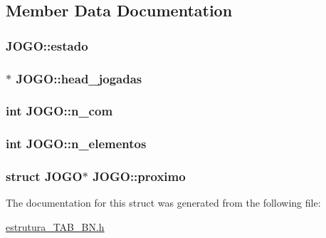 \subsection{Member Data Documentation}
\hypertarget{structJOGO_a8be710a209c24ac0f77dc6ec345131c0}{
\subsubsection[{estado}]{ J\-O\-G\-O\-::estado}}\label{structJOGO_a8be710a209c24ac0f77dc6ec345131c0}
\hypertarget{structJOGO_ae6a10fd45e48577ebe24ce85f0d3ce66}{
\subsubsection[{head\-\_\-jogadas}]{$\ast$ J\-O\-G\-O\-::head\-\_\-jogadas}}\label{structJOGO_ae6a10fd45e48577ebe24ce85f0d3ce66}
\hypertarget{structJOGO_a8a2e1124aa5a80bca5be947df1d1d5e4}{
\subsubsection[{n\-\_\-com}]{\setlength{\rightskip}{0pt plus 5cm}int J\-O\-G\-O\-::n\-\_\-com}}\label{structJOGO_a8a2e1124aa5a80bca5be947df1d1d5e4}
\hypertarget{structJOGO_a207d5e6dc2e307c6ecabe6d593b06a35}{
\subsubsection[{n\-\_\-elementos}]{\setlength{\rightskip}{0pt plus 5cm}int J\-O\-G\-O\-::n\-\_\-elementos}}\label{structJOGO_a207d5e6dc2e307c6ecabe6d593b06a35}
\hypertarget{structJOGO_a2657c0fd23964f1adde229f158aa73bd}{
\subsubsection[{proximo}]{\setlength{\rightskip}{0pt plus 5cm}struct {\bf J\-O\-G\-O}$\ast$ J\-O\-G\-O\-::proximo}}\label{structJOGO_a2657c0fd23964f1adde229f158aa73bd}


The documentation for this struct was generated from the following file\-:\begin{DoxyCompactItemize}
\item 
\hyperlink{estrutura__TAB__BN_8h}{estrutura\-\_\-\-T\-A\-B\-\_\-\-B\-N.\-h}\end{DoxyCompactItemize}
